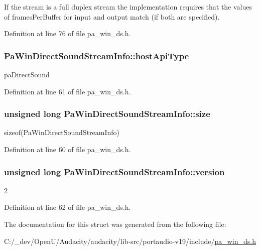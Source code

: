 If the stream is a full duplex stream the implementation requires that the values of frames\+Per\+Buffer for input and output match (if both are specified). 

Definition at line 76 of file pa\+\_\+win\+\_\+ds.\+h.

\subsubsection[{\texorpdfstring{host\+Api\+Type}{hostApiType}}]{ Pa\+Win\+Direct\+Sound\+Stream\+Info\+::host\+Api\+Type}\hypertarget{struct_pa_win_direct_sound_stream_info_a86baa9ebeb0f10ca2f4fe24c41cd3bea}{}\label{struct_pa_win_direct_sound_stream_info_a86baa9ebeb0f10ca2f4fe24c41cd3bea}
pa\+Direct\+Sound 

Definition at line 61 of file pa\+\_\+win\+\_\+ds.\+h.

\subsubsection[{\texorpdfstring{size}{size}}]{\setlength{\rightskip}{0pt plus 5cm}unsigned long Pa\+Win\+Direct\+Sound\+Stream\+Info\+::size}\hypertarget{struct_pa_win_direct_sound_stream_info_a628ca7f8b755a42182a76f9e88202ea0}{}\label{struct_pa_win_direct_sound_stream_info_a628ca7f8b755a42182a76f9e88202ea0}
sizeof(\+Pa\+Win\+Direct\+Sound\+Stream\+Info) 

Definition at line 60 of file pa\+\_\+win\+\_\+ds.\+h.

\subsubsection[{\texorpdfstring{version}{version}}]{\setlength{\rightskip}{0pt plus 5cm}unsigned long Pa\+Win\+Direct\+Sound\+Stream\+Info\+::version}\hypertarget{struct_pa_win_direct_sound_stream_info_a9baec8b75c5b93b59217625b790bebbe}{}\label{struct_pa_win_direct_sound_stream_info_a9baec8b75c5b93b59217625b790bebbe}
2 

Definition at line 62 of file pa\+\_\+win\+\_\+ds.\+h.



The documentation for this struct was generated from the following file\+:\begin{DoxyCompactItemize}
\item 
C\+:/\+\_\+dev/\+Open\+U/\+Audacity/audacity/lib-\/src/portaudio-\/v19/include/\hyperlink{pa__win__ds_8h}{pa\+\_\+win\+\_\+ds.\+h}\end{DoxyCompactItemize}
